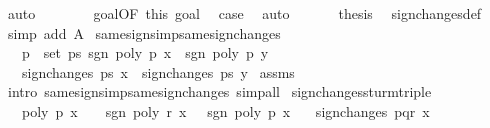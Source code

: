 \begin{isabellebody}
\ auto\isanewline
\ \ \ \ \ \ \isamarkupfalse%
\ goal{}{\isacharparenleft}{}{\isacharparenright}{\isacharbrackleft}OF\ this{\isacharbrackright}\ goal{}{\isacharparenleft}{}{\isacharparenright}\ \isamarkupfalse%
\ {\isacharquery}case\ \isamarkupfalse%
\ auto\isanewline
\ \ \isamarkupfalse%
\isanewline
\ \ \isamarkupfalse%
\ {\isacharquery}thesis\ \isamarkupfalse%
\ sign{\isacharunderscore}changes{\isacharunderscore}def\ \isamarkupfalse%
\ {\isacharparenleft}simp\ add{\isacharcolon}\ A{\isacharparenright}\isanewline
{}\isamarkupfalse%
%
\endisatagproof
{\isafoldproof}%
%
\isadelimproof
\isanewline
%
\endisadelimproof
\isanewline
{}\isamarkupfalse%
\ same{\isacharunderscore}signs{\isacharunderscore}imp{\isacharunderscore}same{\isacharunderscore}sign{\isacharunderscore}changes{\isacharprime}{\isacharcolon}\isanewline
\ \ \ {\isachardoublequoteopen}{\isasymforall}p\ {\isasymin}\ set\ ps{\isachardot}\ sgn\ {\isacharparenleft}poly\ p\ x{\isacharparenright}\ {\isacharequal}\ sgn\ {\isacharparenleft}poly\ p\ y{\isacharparenright}{\isachardoublequoteclose}\isanewline
\ \ \ {\isachardoublequoteopen}sign{\isacharunderscore}changes\ ps\ x\ {\isacharequal}\ sign{\isacharunderscore}changes\ ps\ y{\isachardoublequoteclose}\isanewline
%
\isadelimproof
%
\endisadelimproof
%
\isatagproof
{}\isamarkupfalse%
\ assms\ \isamarkupfalse%
\ {\isacharparenleft}intro\ same{\isacharunderscore}signs{\isacharunderscore}imp{\isacharunderscore}same{\isacharunderscore}sign{\isacharunderscore}changes{\isacharcomma}\ simp{\isacharunderscore}all{\isacharparenright}%
\endisatagproof
{\isafoldproof}%
%
\isadelimproof
\isanewline
%
\endisadelimproof
\isanewline
{}\isamarkupfalse%
\ sign{\isacharunderscore}changes{\isacharunderscore}sturm{\isacharunderscore}triple{\isacharcolon}\isanewline
\ \ \ {\isachardoublequoteopen}poly\ p\ x\ {\isasymnoteq}\ {}{\isachardoublequoteclose}\ \ {\isachardoublequoteopen}sgn\ {\isacharparenleft}poly\ r\ x{\isacharparenright}\ {\isacharequal}\ {\isacharminus}\ sgn\ {\isacharparenleft}poly\ p\ x{\isacharparenright}{\isachardoublequoteclose}\isanewline
\ \ \ {\isachardoublequoteopen}sign{\isacharunderscore}changes\ {\isacharbrackleft}p{\isacharcomma}q{\isacharcomma}r{\isacharbrackright}\ x\ {\isacharequal}\ {}{\isachardoublequoteclose}\isanewline

\end{isabellebody}
